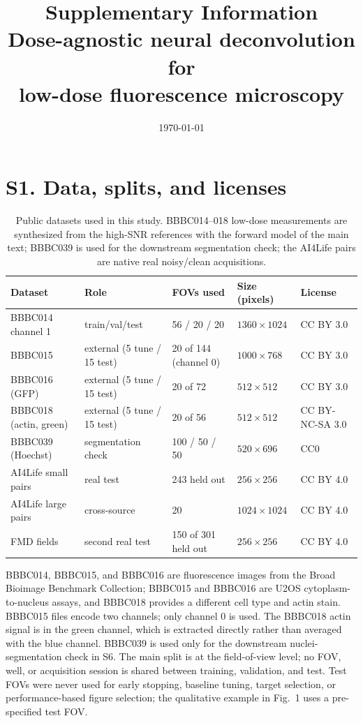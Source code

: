 \documentclass[11pt]{article}
\title{\bfseries Supplementary Information\\
Dose-agnostic neural deconvolution for\\
low-dose fluorescence microscopy}
\author{}
\date{\today}
\begin{document}
\maketitle

\section*{S1. Data, splits, and licenses}
\begin{table}[h]
\centering
\caption{Public datasets used in this study. BBBC014--018 low-dose measurements
are synthesized from the high-SNR references with the forward model of the main
text; BBBC039 is used for the downstream segmentation check; the AI4Life pairs
are native real noisy/clean acquisitions.}
\small
\begin{tabular}{lllll}
\toprule
Dataset & Role & FOVs used & Size (pixels) & License \\
\midrule
BBBC014 channel 1 & train/val/test & 56 / 20 / 20 & $1360\times1024$ & CC BY 3.0 \\
BBBC015 & external (5 tune / 15 test) & 20 of 144 (channel 0) & $1000\times768$ & CC BY 3.0 \\
BBBC016 (GFP) & external (5 tune / 15 test) & 20 of 72 & $512\times512$ & CC BY 3.0 \\
BBBC018 (actin, green) & external (5 tune / 15 test) & 20 of 56 & $512\times512$ & CC BY-NC-SA 3.0 \\
BBBC039 (Hoechst) & segmentation check & 100 / 50 / 50 & $520\times696$ & CC0 \\
AI4Life small pairs & real test & 243 held out & $256\times256$ & CC BY 4.0 \\
AI4Life large pairs & cross-source & 20 & $1024\times1024$ & CC BY 4.0 \\
FMD fields & second real test & 150 of 301 held out & $256\times256$ & CC BY 4.0 \\
\bottomrule
\end{tabular}
\end{table}

BBBC014, BBBC015, and BBBC016 are fluorescence images from the Broad Bioimage
Benchmark Collection; BBBC015 and BBBC016 are U2OS cytoplasm-to-nucleus assays,
and BBBC018 provides a different cell type and actin stain. BBBC015 files encode
two channels; only channel 0 is used. The BBBC018 actin signal is in the green
channel, which is extracted directly rather than averaged with the blue
channel. BBBC039 is used only for the downstream nuclei-segmentation check in
S6. The main split is at
the field-of-view level; no FOV, well, or acquisition session is shared between
training, validation, and test. Test FOVs were never used for early stopping,
baseline tuning, target selection, or performance-based figure selection; the
qualitative example in Fig.~1 uses a pre-specified test FOV.
\end{document}
